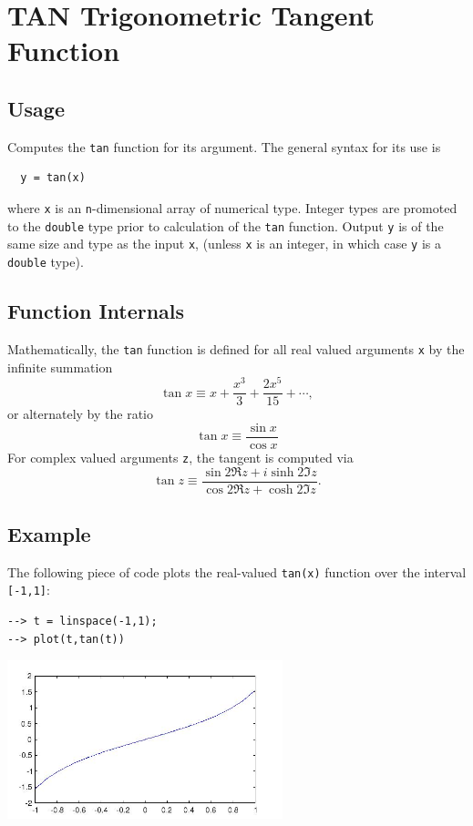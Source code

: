 \section{TAN Trigonometric Tangent Function}

\subsection{Usage}

Computes the \verb|tan| function for its argument.  The general
syntax for its use is
\begin{verbatim}
  y = tan(x)
\end{verbatim}
where \verb|x| is an \verb|n|-dimensional array of numerical type.
Integer types are promoted to the \verb|double| type prior to
calculation of the \verb|tan| function.  Output \verb|y| is of the
same size and type as the input \verb|x|, (unless \verb|x| is an
integer, in which case \verb|y| is a \verb|double| type).  
\subsection{Function Internals}

Mathematically, the \verb|tan| function is defined for all real
valued arguments \verb|x| by the infinite summation
\[
  \tan x \equiv x + \frac{x^3}{3} + \frac{2x^5}{15} + \cdots,
\]
or alternately by the ratio
\[
  \tan x \equiv \frac{\sin x}{\cos x}
\]
For complex valued arguments \verb|z|, the tangent is computed via
\[
  \tan z \equiv \frac{\sin 2 \Re z + i \sinh 2 \Im z}
                     {\cos 2 \Re z + \cosh 2 \Im z}.
\]
\subsection{Example}

The following piece of code plots the real-valued \verb|tan(x)|
function over the interval \verb|[-1,1]|:
\begin{verbatim}
--> t = linspace(-1,1);
--> plot(t,tan(t))
\end{verbatim}


\centerline{\includegraphics[width=8cm]{tanplot}}

